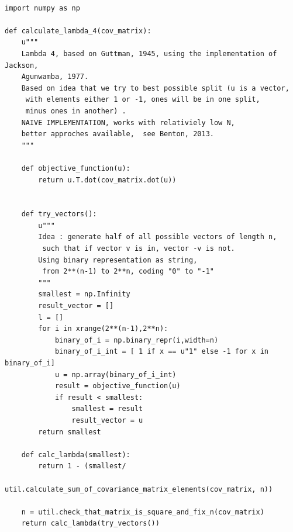\documentclass[a4paper,12pt,oneside]{article}
\newenvironment{customFloatWrap}{}{}
\numberwithin{equation}{section}
\theoremstyle{definition}
\begin{document}
\begin{subappendices}
\begin{customFloatWrap}
\begin{verbatim}
\end{verbatim}
\end{customFloatWrap}

\vspace{10pt}
        
\begin{customFloatWrap}
\begin{verbatim}

import numpy as np

def calculate_lambda_4(cov_matrix):
    u"""
    Lambda 4, based on Guttman, 1945, using the implementation of Jackson,
    Agunwamba, 1977.
    Based on idea that we try to best possible split (u is a vector,
     with elements either 1 or -1, ones will be in one split, 
     minus ones in another) .
    NAIVE IMPLEMENTATION, works with relativiely low N, 
    better approches available,  see Benton, 2013.
    """
    
    def objective_function(u):
        return u.T.dot(cov_matrix.dot(u))

    
    def try_vectors():
        u"""
        Idea : generate half of all possible vectors of length n,
         such that if vector v is in, vector -v is not. 
        Using binary representation as string,
         from 2**(n-1) to 2**n, coding "0" to "-1"
        """
        smallest = np.Infinity
        result_vector = []
        l = []
        for i in xrange(2**(n-1),2**n):
            binary_of_i = np.binary_repr(i,width=n)
            binary_of_i_int = [ 1 if x == u"1" else -1 for x in binary_of_i]
            u = np.array(binary_of_i_int)
            result = objective_function(u)
            if result < smallest:
                smallest = result
                result_vector = u
        return smallest
             
    def calc_lambda(smallest):
        return 1 - (smallest/
            util.calculate_sum_of_covariance_matrix_elements(cov_matrix, n))
        
    n = util.check_that_matrix_is_square_and_fix_n(cov_matrix)
    return calc_lambda(try_vectors())

\end{verbatim}
\end{customFloatWrap}

\vspace{10pt}


\end{subappendices}
\end{document}

